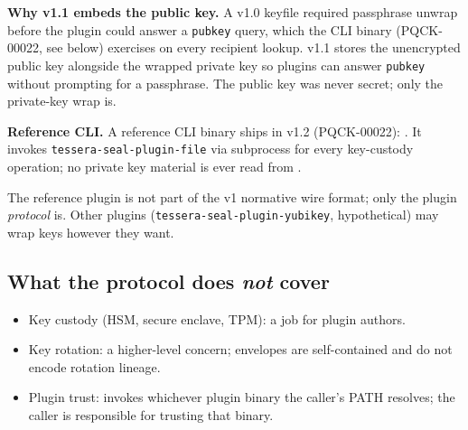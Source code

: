 \textbf{Why v1.1 embeds the public key.} A v1.0 keyfile required passphrase unwrap before the plugin could answer a \texttt{pubkey} query, which the CLI binary (PQCK-00022, see below) exercises on every recipient lookup. v1.1 stores the unencrypted public key alongside the wrapped private key so plugins can answer \texttt{pubkey} without prompting for a passphrase. The public key was never secret; only the private-key wrap is.

\textbf{Reference CLI.} A reference CLI binary ships in v1.2 (PQCK-00022): . It invokes \texttt{tessera-seal-plugin-file} via subprocess for every key-custody operation; no private key material is ever read from .

The reference plugin is not part of the v1 normative wire format; only the plugin \emph{protocol} is. Other plugins (\texttt{tessera-seal-plugin-yubikey}, hypothetical) may wrap keys however they want.

\subsection{What the protocol does \emph{not} cover}

\begin{itemize}
\item Key custody (HSM, secure enclave, TPM): a job for plugin authors.
\item Key rotation: a higher-level concern; \pqcrypt{} envelopes are self-contained and do not encode rotation lineage.
\item Plugin trust: \pqcrypt{} invokes whichever plugin binary the caller's PATH resolves; the caller is responsible for trusting that binary.
\end{itemize}
